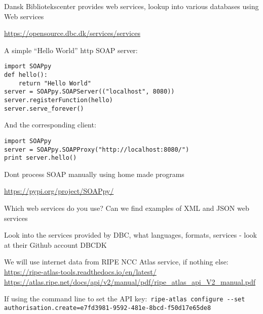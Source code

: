 \documentclass[Screen16to9,17pt]{foils}
\begin{document}

\begin{list2}
\item Dansk Bibliotekscenter provides web services, lookup into various databases using Web services
\item \url{https://opensource.dbc.dk/services/services}
\end{list2}


A simple “Hello World” http SOAP server:

\begin{verbatim}
import SOAPpy
def hello():
    return "Hello World"
server = SOAPpy.SOAPServer(("localhost", 8080))
server.registerFunction(hello)
server.serve_forever()
\end{verbatim}
And the corresponding client:

\begin{verbatim}
import SOAPpy
server = SOAPpy.SOAPProxy("http://localhost:8080/")
print server.hello()
\end{verbatim}


\begin{list2}
\item Dont process SOAP manually using home made programs
\item \url{https://pypi.org/project/SOAPpy/}
\end{list2}






\begin{list2}
\item Which web services do you use? Can we find examples of XML and JSON web services
\item Look into the services provided by DBC, what languages, formats, services - look at their Github account DBCDK
\item We will use internet data from RIPE NCC Atlas service, if nothing else:\\
{\footnotesize\url{https://ripe-atlas-tools.readthedocs.io/en/latest/}\\
\url{https://atlas.ripe.net/docs/api/v2/manual/pdf/ripe_atlas_api_V2_manual.pdf}}
\item If using the command line to set the API key:\
\verb+ripe-atlas configure --set authorisation.create=e7fd3981-9592-481e-8bcd-f50d17e65de8+

\end{list2}



\slidenext
\end{document}
